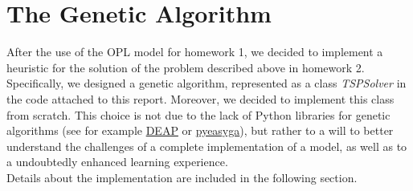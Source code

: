 \documentclass{article}
\begin{document}
\section{The Genetic Algorithm}\label{sec:algorithm}
After the use of the OPL model for homework 1, we decided to implement a heuristic for the solution of the problem described above in homework 2. Specifically, we designed a genetic algorithm, represented as a class \textit{TSPSolver} in the code attached to this report. Moreover, we decided to implement this class from scratch. This choice is not due to the lack of Python libraries for genetic algorithms (see for example \href{https://deap.readthedocs.io/en/master/}{DEAP} or  \href{https://pyeasyga.readthedocs.io/en/latest/index.html}{pyeasyga}), but rather to a will to better understand the challenges of a complete implementation of a model, as well as to a undoubtedly enhanced learning experience. \\
Details about the implementation are included in the following section.
\end{document}
